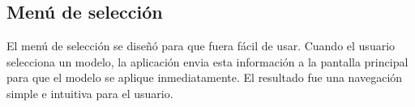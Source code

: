 \documentclass[conference]{IEEEtran}
\begin{document}
    \subsection{Menú de selección}
        El menú de selección se diseñó para que fuera fácil de usar. Cuando el usuario selecciona un modelo, la aplicación envia esta información a la pantalla principal para que el modelo se aplique inmediatamente. El resultado fue una navegación simple e intuitiva para el usuario.
        \begin{figure}[h!]
            \centering
            \quad
            \quad
\end{figure}
\end{document}
